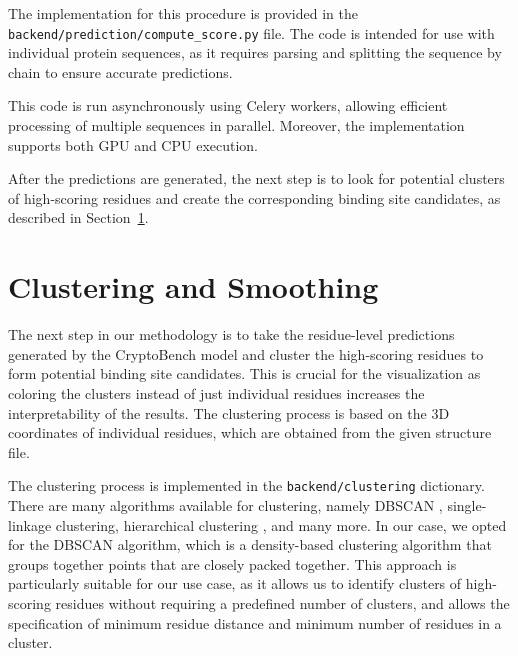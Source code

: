 \sloppy
The implementation for this procedure is provided in the \lstinline!backend/prediction/compute_score.py! file. The code is intended for use with individual protein sequences, as it requires parsing and splitting the sequence by chain to ensure accurate predictions.

This code is run asynchronously using Celery workers, allowing efficient processing of multiple sequences in parallel. Moreover, the implementation supports both GPU and CPU execution.

After the predictions are generated, the next step is to look for potential clusters of high-scoring residues and create the corresponding binding site candidates, as described in Section~\ref{sec:clustering}.

\section{Clustering and Smoothing}
\label{sec:clustering}

The next step in our methodology is to take the residue-level predictions generated by the CryptoBench model and cluster the high-scoring residues to form potential binding site candidates. This is crucial for the visualization as coloring the clusters instead of just individual residues increases the interpretability of the results. The clustering process is based on the 3D coordinates of individual residues, which are obtained from the given structure file.

The clustering process is implemented in the \lstinline!backend/clustering! dictionary. There are many algorithms available for clustering, namely DBSCAN \cite{schubert2017dbscan}, single-linkage clustering, hierarchical clustering \cite{jarman2020hierarchical}, and many more. In our case, we opted for the DBSCAN algorithm, which is a density-based clustering algorithm that groups together points that are closely packed together. This approach is particularly suitable for our use case, as it allows us to identify clusters of high-scoring residues without requiring a predefined number of clusters, and allows the specification of minimum residue distance and minimum number of residues in a cluster.

